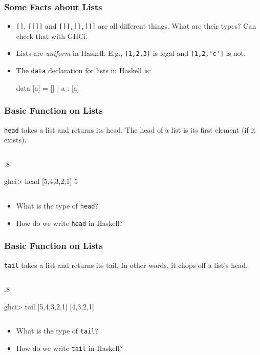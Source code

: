 \documentclass{beamer}
\newenvironment{codeblock}[1][.8]{%
\begin{columns}
\begin{column}{#1\linewidth}
\begin{exampleblock}{}}{%
\end{exampleblock}
\end{column}
\end{columns}}
\begin{document}
\begin{frame}[fragile]
\frametitle{Some Facts about Lists}

\begin{itemize}

\item \verb+[]+, \verb+[[]]+ and \verb+[[],[],[]]+ are all different things. What are their types? Can check that with GHCi.

\pause

\item Lists are \emph{uniform} in Haskell. E.g., \verb+[1,2,3]+ is legal and \verb+[1,2,'c']+ is not.

\pause 

\item The \verb+data+ declaration for lists in Haskell is:
\begin{hcode}
data [a] = [] | a : [a]
\end{hcode}


\end{itemize}


\end{frame}

\begin{frame}[fragile]
\frametitle{Basic Function on Lists}

\verb+head+ takes a list and returns its head. The head of a list is  its first element (if it exists).
\begin{codeblock}
\begin{hcode}
ghci> head [5,4,3,2,1]  
5
\end{hcode}
\end{codeblock}

\begin{itemize}

\item What is the type of \verb+head+?

\item How do we write \verb+head+ in Haskell?

\end{itemize}

\end{frame}

\begin{frame}[fragile]
\frametitle{Basic Function on Lists}

\verb+tail+ takes a list and returns its tail. In other words, it chops off a list's head.

\begin{codeblock}
\begin{hcode}
ghci> tail [5,4,3,2,1]  
[4,3,2,1]  
\end{hcode}
\end{codeblock}

\begin{itemize}

\item What is the type of \verb+tail+?

\item How do we write \verb+tail+ in Haskell?

\end{itemize}

\end{frame}
\end{document}
